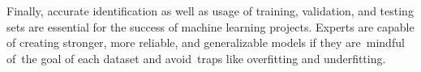 Finally, accurate identification as well as usage of training, validation, and testing sets are essential for the success of machine learning projects. Experts are capable of creating stronger, more reliable, and generalizable models if they are mindful of the goal of each dataset and avoid traps like overfitting and underfitting.